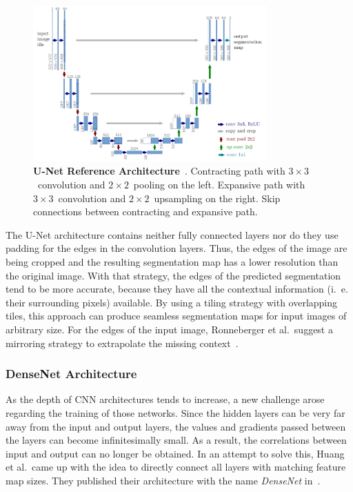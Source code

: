 \begin{figure}[h]
    \centering
    \includegraphics[width=0.8\textwidth]{images/u-net-architecture}
    \caption[U-Net Reference Architecture]
    {\textbf{U-Net Reference Architecture}~\cite{unet15}. Contracting path with $3\times 3$~convolution and $2\times 2$~pooling on the left. Expansive path with $3\times 3$~convolution and $2\times 2$~upsampling on the right. Skip connections between contracting and expansive path.}
    \label{fig:unet_architecture}
\end{figure}

The U-Net architecture contains neither fully connected layers nor do they use padding for the edges in the convolution layers. Thus, the edges of the image are being cropped and the resulting segmentation map has a lower resolution than the original image. With that strategy, the edges of the predicted segmentation tend to be more accurate, because they have all the contextual information (i.~e. their surrounding pixels) available. By using a tiling strategy with overlapping tiles, this approach can produce seamless segmentation maps for input images of arbitrary size. For the edges of the input image, Ronneberger et al.\ suggest a mirroring strategy to extrapolate the missing context~\cite{unet15}.

\subsubsection{DenseNet Architecture}
\label{sec:densenet}
As the depth of CNN architectures tends to increase, a new challenge arose regarding the training of those networks. Since the hidden layers can be very far away from the input and output layers, the values and gradients passed between the layers can become infinitesimally small. As a result, the correlations between input and output can no longer be obtained. In an attempt to solve this, Huang et al.\ came up with the idea to directly connect all layers with matching feature map sizes. They published their architecture with the name \emph{DenseNet} in~\cite{densenet17}.

